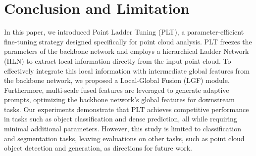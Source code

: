 \section{Conclusion and Limitation}
\label{sec:conclusion&limitation}

In this paper, we introduced Point Ladder Tuning (PLT), a parameter-efficient fine-tuning strategy designed specifically for point cloud analysis. PLT freezes the parameters of the backbone network and employs a hierarchical Ladder Network (HLN) to extract local information directly from the input point cloud. To effectively integrate this local information with intermediate global features from the backbone network, we proposed a Local-Global Fusion (LGF) module. Furthermore, multi-scale fused features are leveraged to generate adaptive prompts, optimizing the backbone network's global features for downstream tasks. Our experiments demonstrate that PLT achieves competitive performance in tasks such as object classification and dense prediction, all while requiring minimal additional parameters. However, this study is limited to classification and segmentation tasks, leaving evaluations on other tasks, such as point cloud object detection and generation, as directions for future work.
